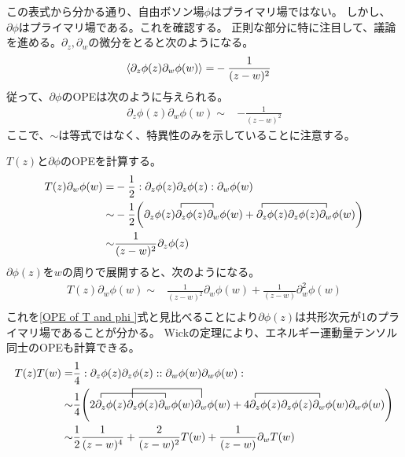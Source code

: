 \documentclass[11pt, dvipdfmx]{article}
\numberwithin{equation}{section}
\newcommand{\blankline}{\par\vspace{\baselineskip}} %
\begin{document}
この表式から分かる通り、自由ボソン場$\phi$はプライマリ場ではない。
しかし、$\partial \phi$はプライマリ場である。これを確認する。
正則な部分に特に注目して、議論を進める。$\partial_z, \partial_w$の微分をとると次のようになる。
\begin{align}
    \ev{\partial_z \phi(z)\partial_w \phi(w)}=&-\frac{1}{(z-w)^2}
\end{align}
従って、$\partial \phi$のOPEは次のように与えられる。
\begin{align}
    \partial_z \phi(z)\partial_w \phi(w)\sim& -\frac{1}{(z-w)^2} 
\end{align}
ここで、$\sim$は等式ではなく、特異性のみを示していることに注意する。
\blankline
$T(z)$と$\partial \phi$のOPEを計算する。
\begin{align}
    T(z)\partial_w \phi(w)=&-\frac{1}{2}:\partial_z \phi(z)\partial_z \phi(z):\partial_w \phi(w)\\
    \sim& -\frac{1}{2}\qty(\contraction{\partial_z\phi(z)}{\partial_z}{\phi(z)}{\partial_z}\partial_z \phi(z)\partial_z \phi(z)\partial_w \phi(w) + \contraction{}{\partial_z}{\phi(z)\partial_z \phi(z)}{\partial_w}\partial_z \phi(z)\partial_z \phi(z)\partial_w \phi(w))\\
    \sim& \frac{1}{(z-w)^2}\partial_z \phi(z) 
\end{align}
$\partial \phi(z)$を$w$の周りで展開すると、次のようになる。
\begin{align}
   T(z)\partial_w \phi(w)\sim& \frac{1}{(z-w)^2}\partial_w \phi(w) + \frac{1}{(z-w)}\partial_w^2 \phi(w) \\
\end{align}
これを\eqref{OPE of T and phi }式と見比べることにより$\partial \phi(z)$は共形次元が1のプライマリ場であることが分かる。
Wickの定理により、エネルギー運動量テンソル同士のOPEも計算できる。
\begin{align}
    T(z)T(w)=&\frac{1}{4}:\partial_z \phi(z)\partial_z \phi(z): :\partial_w \phi(w)\partial_w \phi(w):\\
    \sim& \frac{1}{4}\qty(2\contraction{}{\partial_z}{\phi(z)\partial_z\phi(z)}{\partial_w}\contraction[2ex]{\partial_z\phi(z)}{\partial_z}{\phi(z)\partial_w\phi(w)}{\partial_w}\partial_z \phi(z)\partial_z \phi(z)\partial_w \phi(w)\partial_w \phi(w) + 4\contraction{}{\partial_z}{\phi(z)\partial_z \phi(z)}{\partial_w}\partial_z \phi(z)\partial_z \phi(z)\partial_w \phi(w)\partial_w \phi(w))\\
    \sim& \frac{1}{2}\frac{1}{(z-w)^4} + \frac{2}{(z-w)^2}T(w) + \frac{1}{(z-w)}\partial_w T(w)
\end{align}
\end{document}
